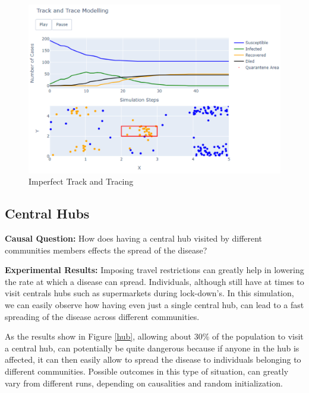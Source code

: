 \vspace{-0.4cm}
\begin{figure}[ht!]%
    \centering
    \includegraphics[width=0.85\linewidth]{latex/images/track2.pdf}
    \vspace{-0.4cm}
    \caption{Imperfect Track and Tracing}
    \label{track2}
\end{figure}
\vspace{-0.3cm}

\subsection{Central Hubs}

\textbf{Causal Question:} How does having a central hub visited by different communities members effects the spread of the disease?

\textbf{Experimental Results:} Imposing travel restrictions can greatly help in lowering the rate at which a disease can spread. Individuals, although still have at times to visit centrals hubs such as supermarkets during lock-down's. In this simulation, we can easily observe how having even just a single central hub, can lead to a fast spreading of the disease across different communities.

As the results show in Figure \ref{hub}, allowing about 30\% of the population to visit a central hub, can potentially be quite dangerous because if anyone in the hub is affected, it can then easily allow to spread the disease to individuals belonging to different communities. Possible outcomes in this type of situation, can greatly vary from different runs, depending on causalities and random initialization.

